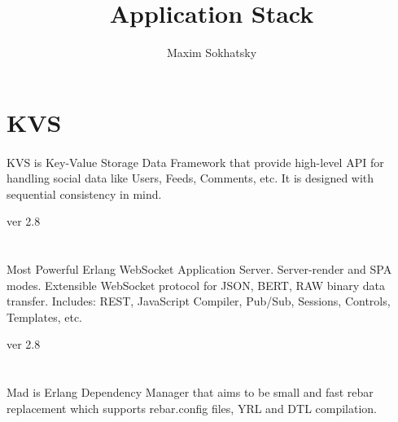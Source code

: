 \documentclass[11pt]{article}
\begin{document}
\title{Application Stack}
\author{Maxim Sokhatsky}


\section*{KVS}
\paragraph{}
KVS is Key-Value Storage Data Framework that provide high-level API for handling
social data like Users, Feeds, Comments, etc. It is designed with sequential consistency in mind.

 ver 2.8


\section*{}

\paragraph{}
Most Powerful Erlang WebSocket Application Server. Server-render and SPA modes.
Extensible WebSocket protocol for JSON, BERT, RAW binary data transfer.
Includes: REST, JavaScript Compiler, Pub/Sub, Sessions, Controls, Templates, etc.

 ver 2.8

\section*{}

\paragraph{}
Mad is Erlang Dependency Manager that aims to be small and fast rebar
replacement which supports rebar.config files, YRL and DTL compilation.
\end{document}
